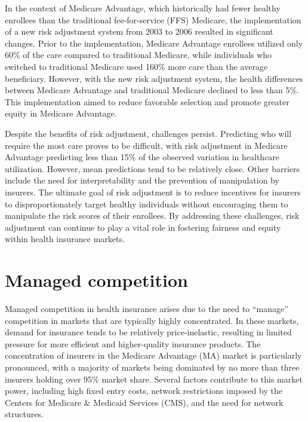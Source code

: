 \documentclass[
  letterpaper,
  DIV=11,
  numbers=noendperiod]{scrreport}
\theoremstyle{definition}
\theoremstyle{remark}
\begin{document}
In the context of Medicare Advantage, which historically had fewer
healthy enrollees than the traditional fee-for-service (FFS) Medicare,
the implementation of a new risk adjustment system from 2003 to 2006
resulted in significant changes. Prior to the implementation, Medicare
Advantage enrollees utilized only 60\% of the care compared to
traditional Medicare, while individuals who switched to traditional
Medicare used 160\% more care than the average beneficiary. However,
with the new risk adjustment system, the health differences between
Medicare Advantage and traditional Medicare declined to less than 5\%.
This implementation aimed to reduce favorable selection and promote
greater equity in Medicare Advantage.

Despite the benefits of risk adjustment, challenges persist. Predicting
who will require the most care proves to be difficult, with risk
adjustment in Medicare Advantage predicting less than 15\% of the
observed variation in healthcare utilization. However, mean predictions
tend to be relatively close. Other barriers include the need for
interpretability and the prevention of manipulation by insurers. The
ultimate goal of risk adjustment is to reduce incentives for insurers to
disproportionately target healthy individuals without encouraging them
to manipulate the risk scores of their enrollees. By addressing these
challenges, risk adjustment can continue to play a vital role in
fostering fairness and equity within health insurance markets.

\hypertarget{managed-competition}{%
\section{Managed competition}\label{managed-competition}}

Managed competition in health insurance arises due to the need to
``manage'' competition in markets that are typically highly
concentrated. In these markets, demand for insurance tends to be
relatively price-inelastic, resulting in limited pressure for more
efficient and higher-quality insurance products. The concentration of
insurers in the Medicare Advantage (MA) market is particularly
pronounced, with a majority of markets being dominated by no more than
three insurers holding over 95\% market share. Several factors
contribute to this market power, including high fixed entry costs,
network restrictions imposed by the Centers for Medicare \& Medicaid
Services (CMS), and the need for network structures.
\end{document}
